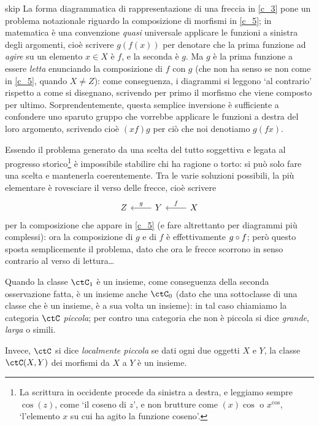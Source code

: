 \begin{hRemark}{skip}\label{sulla_compo}
	La forma diagrammatica di rappresentazione di una freccia in \ref{c_3} pone un problema notazionale riguardo la composizione di morfismi in \ref{c_5}; in matematica è una convenzione \emph{quasi} universale applicare le funzioni a sinistra degli argomenti, cioè scrivere \(g(f(x))\) per denotare che la prima funzione ad \emph{agire} su un elemento \(x\in X\) è \(f\), e la seconda è \(g\). Ma \(g\) è la prima funzione a essere \emph{letta} enunciando la composizione di \(f\) con \(g\) (che non ha senso se non come in \ref{c_5}, quando \(X\ne Z\)): come conseguenza, i diagrammi si leggono `al contrario' rispetto a come si disegnano, scrivendo per primo il morfismo che viene composto per ultimo.  Sorprendentemente, questa semplice inversione è sufficiente a confondere uno sparuto gruppo che vorrebbe applicare le funzioni a destra del loro argomento, scrivendo cioè \((xf)g\) per ciò che noi denotiamo \(g(fx)\).

	Essendo il problema generato da una scelta del tutto soggettiva e legata al progresso storico\footnote{La scrittura in occidente procede da sinistra a destra, e leggiamo sempre \(\cos(z)\), come `il coseno di \(z\)', e non brutture come \((x)\!\cos\) o \(x^{\cos}\), `l'elemento \(x\) su cui ha agito la funzione coseno'.} è impossibile stabilire chi ha ragione o torto: si può solo fare una scelta e mantenerla coerentemente. Tra le varie soluzioni possibili, la più elementare è rovesciare il verso delle frecce, cioè scrivere
	\[
		\begin{tikzcd}
			Z
			& Y \ar[l, "g"'] & X \ar[l, "f"']
		\end{tikzcd}
	\]
	per la composizione che appare in \ref{c_5} (e fare altrettanto per diagrammi più complessi): ora la composizione di \(g\) e di \(f\) è effettivamente \(g\circ f\); però questo sposta semplicemente il problema, dato che ora le frecce scorrono in senso contrario al verso di lettura\dots
\end{hRemark}
\begin{definition}\label{def_cat_piccola_locpiccola}
	Quando la classe \(\ctC_1\) è un insieme, come conseguenza della seconda osservazione fatta, è un insieme anche \(\ctC_0\) (dato che una sottoclasse di una classe che è un insieme, è a sua volta un insieme): in tal caso chiamiamo la categoria \(\ctC\) \emph{piccola}; per contro	una categoria che non è piccola si dice \emph{grande}, \emph{larga} o simili.

	Invece, \(\ctC\) si dice \emph{localmente piccola} se dati ogni due oggetti \(X\) e \(Y\), la classe \(\Hom{\ctC}(X,Y)\) dei morfismi da \(X\) a \(Y\) è un insieme.
\end{definition}
